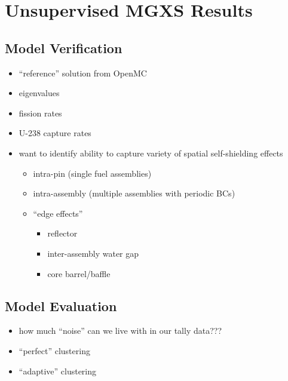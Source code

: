 \chapter{Unsupervised MGXS Results}
\label{chap:results}


\section{Model Verification}
\label{sec:chap7-verify}

\begin{itemize}[noitemsep]
  \item ``reference'' solution from OpenMC
  \item eigenvalues
  \item fission rates
  \item U-238 capture rates
  \item want to identify ability to capture variety of spatial self-shielding effects
  \begin{itemize}[noitemsep]
    \item intra-pin (single fuel assemblies)
    \item intra-assembly (multiple assemblies with periodic BCs)
    \item ``edge effects''
    \begin{itemize}[noitemsep]
      \item reflector
      \item inter-assembly water gap
      \item core barrel/baffle
    \end{itemize}
  \end{itemize}
\end{itemize}


\section{Model Evaluation}
\label{sec:chap7-evaluate}


\begin{itemize}[noitemsep]
  \item how much ``noise'' can we live with in our tally data???
  \item ``perfect'' clustering
  \item ``adaptive'' clustering
\end{itemize}



